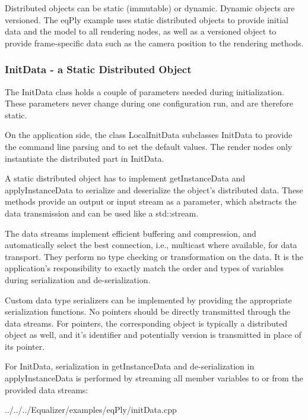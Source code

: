 \documentclass[10pt,a4]{scrartcl}
\begin{document}
Distributed objects can be static (immutable) or dynamic. Dynamic objects are
versioned. The \textsf{eqPly} example uses static distributed objects to provide
initial data and the model to all rendering nodes, as well as a versioned object
to provide frame-specific data such as the camera position to the rendering
methods.

\subsubsection{\label{sInitData}InitData - a Static Distributed Object}

The \textsf{InitData} class holds a couple of parameters needed during
initialization. These parameters never change during one configuration
run, and are therefore static.

On the application side, the class \textsf{LocalInitData} subclasses
\textsf{InitData} to provide the command line parsing and to set the
default values. The render nodes only instantiate the distributed part
in \textsf{InitData}.

A static distributed object has to implement \textsf{getInstanceData}
and \textsf{applyInstanceData} to serialize and deserialize the object's
distributed data. These methods provide an output or input stream as a
parameter, which abstracts the data transmission and can be used like a
\textsf{std::stream}.

The data streams implement efficient buffering and compression, and
automatically select the best connection, i.e., multicast where available, for
data transport. They perform no type checking or transformation on the data. It
is the application's responsibility to exactly match the order and types of
variables during serialization and de-serialization.

Custom data type serializers can be implemented by providing the
appropriate serialization functions. No pointers should be directly
transmitted through the data streams. For pointers, the corresponding
object is typically a distributed object as well, and it's identifier
and potentially version is transmitted in place of its pointer.

For \textsf{InitData}, serialization in \textsf{getInstanceData}
and de-serialization in \textsf{applyInstanceData} is performed by
streaming all member variables to or from the provided data
streams:

{\footnotesize
  {../../../Equalizer/examples/eqPly/initData.cpp}}
\end{document}
